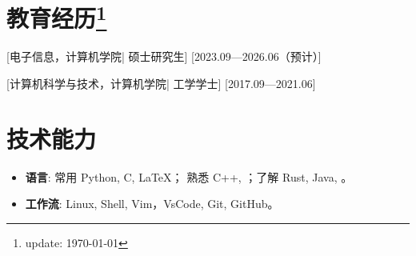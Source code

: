 \documentclass{resume}
\begin{document}


\ResumeTitle

\section[教育经历]{教育经历\protect\footnote{update: \today}}
[\textnormal{电子信息，计算机学院|}  硕士研究生]
[2023.09—2026.06（预计）]

[\textnormal{计算机科学与技术，计算机学院|} 工学学士]
[2017.09—2021.06]

\section[技术能力]{技术能力\protect}
\begin{itemize}
  \item \textbf{语言}: 常用 Python, C, \LaTeX； 熟悉 C++, ；了解 Rust, Java, 。
  \item \textbf{工作流}: Linux, Shell, Vim，VsCode, Git, GitHub。
\end{itemize}



\end{document}
